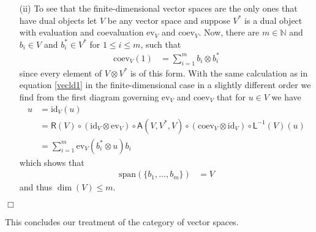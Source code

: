 \begin{prf}
\begin{enumerate}
\item[(ii)]
To see that the finite-dimensional vector spaces are the only ones that have dual objects let $V$ be any vector space and suppose $V^{\ast}$ is a dual object with evaluation and coevaluation $\mathrm{ev}_{V}$ and $\mathrm{coev}_{V}$. Now, there are $m \in \mathbb{N}$ and $b_{i} \in V$ and $b_{i}^{\ast} \in V^{\ast}$ for $1 \leq i \leq m$, such that
\begin{align*}
  \mathrm{coev}_{V}(1)
  &=
  \sum_{i = 1}^{m}
  b_{i}
  \otimes
  b_{i}^{\ast}
\end{align*}
since every element of $V \otimes V^{\ast}$ is of this form. With the same calculation as in equation \eqref{vecld1} in the finite-dimensional case in a slightly different order we find from the first diagram governing $\mathrm{ev}_{V}$ and $\mathrm{coev}_{V}$ that for $u \in V$ we have
\begin{align*}
  u
  &=
  \mathrm{id}_{V}(u)
  \\
  &=
  \mathsf{R}(V)
  \circ
  \left(
    \mathrm{id}_{V}
    \otimes
    \mathrm{ev}_{V}
  \right)
  \circ
  \mathsf{A}(V,V^{\ast},V)
  \circ
  \left(
    \mathrm{coev}_{V}
    \otimes
    \mathrm{id}_{V}
  \right)
  \circ
  \mathsf{L}^{-1}(V)(u)
  \\
  &=
  \sum_{i = 1}^{m}
  \mathrm{ev}_{V}(b_{i}^{\ast} \otimes u)
  b_{i}
\end{align*}
which shows that
\begin{align*}
  \mathrm{span}
  \left(
    \lbrace
      b_{1}
      ,
      \ldots
      ,
      b_{m}
    \rbrace
  \right)
  &=
  V
\end{align*}
and thus $\dim(V) \leq m$.
\end{enumerate}
\phantom{proven}
\hfill
$\Box$
\end{prf}
This concludes our treatment of the category of vector spaces.
